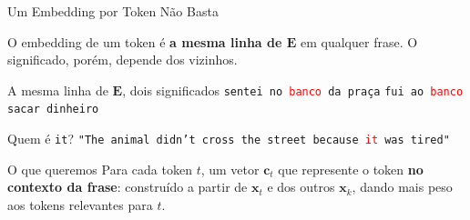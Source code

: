 \documentclass[aspectratio=169,xcolor=dvipsnames]{beamer}
\begin{document}
\begin{frame}{Um Embedding por Token Não Basta}

O embedding de um token é \textbf{a mesma linha de $\mathbf{E}$} em qualquer frase. O significado, porém, depende dos vizinhos.

\vspace{6pt}

\begin{exampleblock}{A mesma linha de $\mathbf{E}$, dois significados}
\centering
\texttt{sentei no \textcolor{red}{banco} da praça} \qquad \texttt{fui ao \textcolor{red}{banco} sacar dinheiro}
\end{exampleblock}

\vspace{4pt}

\begin{exampleblock}{Quem é \texttt{it}?}
\centering
\texttt{"The animal didn't cross the street because \textcolor{red}{it} was tired"}
\end{exampleblock}

\vspace{6pt}

\begin{block}{O que queremos}
Para cada token $t$, um vetor $\mathbf{c}_t$ que represente o token \textbf{no contexto da frase}: construído a partir de $\mathbf{x}_t$ e dos outros $\mathbf{x}_k$, dando mais peso aos tokens relevantes para $t$.
\end{block}

\end{frame}

\end{document}
